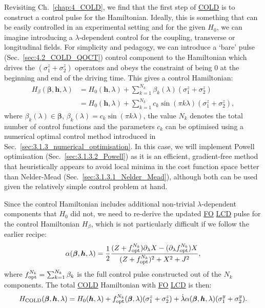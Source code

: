 \documentclass[a4paper,oneside,11pt]{book}
\newcommand{\betabb}{\boldsymbol{\beta}}
\newcommand{\hbb}{\boldsymbol{h}}
\newcommand{\sy}{\sigma^y}
\newcommand{\sz}{\sigma^z}
\newcommand{\dlambda}{\partial_{\lambda}}
\newcommand{\dotlambda}{\dot{\lambda}}
\newcommand{\acrref}[1]{\hyperref[acr:#1]{#1}}
\begin{document}
Revisiting Ch.~\ref{chap:4_COLD}, we find that the first step of \acrref{COLD} is to construct a control pulse for the Hamiltonian. Ideally, this is something that can be easily controlled in an experimental setting and for the given $H_0$, we can imagine introducing a $\lambda$-dependent control for the coupling, transverse or longitudinal fields. For simplicity and pedagogy, we can introduce a `bare' pulse (Sec.~\ref{sec:4.2_COLD_QOCT}) control component to the Hamiltonian which drives the $(\sz_1 + \sz_2)$ operators and obeys the constraint of being $0$ at the beginning and end of the driving time. This gives a control Hamiltonian:
\begin{equation}\label{eq:COLD_twospin_controlH}
    \begin{aligned}
        H_\beta(\betabb, \hbb, \lambda) &= H_0(\hbb, \lambda) + \sum_{k=1}^{N_k} \beta_k(\lambda) (\sz_{1} + \sz_{2}) \\
        &= H_0(\hbb, \lambda) + \sum_{k=1}^{N_k} c_k \sin (\pi k \lambda) (\sz_{1} + \sz_{2}),
    \end{aligned}
\end{equation}
where $\beta_k(\lambda) \in \betabb$, $\beta_k(\lambda) = c_k \sin (\pi k \lambda)$, the value $N_k$ denotes the total number of control functions and the parameters $c_k$ can be optimised using a numerical optimal control method introduced in Sec.~\ref{sec:3.1.3_numerical_optimisation}. In this case, we will implement Powell optimisation (Sec.~\ref{sec:3.1.3.2_Powell}) as it is an efficient, gradient-free method that heuristically appears to avoid local minima in the cost function space better than Nelder-Mead (Sec.~\ref{sec:3.1.3.1_Nelder_Mead}), although both can be used given the relatively simple control problem at hand. 

Since the control Hamiltonian includes additional non-trivial $\lambda$-dependent components that $H_0$ did not, we need to re-derive the updated \acrref{FO} \acrref{LCD} pulse for the control Hamiltonian $H_{\beta}$, which is not particularly difficult if we follow the earlier recipe:
\begin{equation}\label{eq:twospin_alpha_COLD}
    \alpha(\betabb, \hbb, \lambda) = \frac{1}{2} \frac{(Z + f_{\rm opt}^{N_k}) \dlambda X - (\dlambda f_{\rm opt}^{N_k}) X}{(Z + f_{\rm opt}^{N_k})^2 + X^2 + J^2},
\end{equation}
where $f_{\rm opt}^{N_k} = \sum_{k=1}^{N_k} \beta_k$ is the full control pulse constructed out of the $N_k$ components. The total \acrref{COLD} Hamiltonian with \acrref{FO} \acrref{LCD} is then:
\begin{equation}\label{eq:twospin_COLD_Ham}
    H_{\rm COLD}(\betabb, \hbb, \lambda) = H_0(\hbb, \lambda) + f_{\rm opt}^{N_k}(\betabb, \lambda)(\sz_1 + \sz_2) + \dotlambda \alpha(\betabb, \hbb, \lambda)(\sy_1 + \sy_2).
\end{equation}
\end{document}

